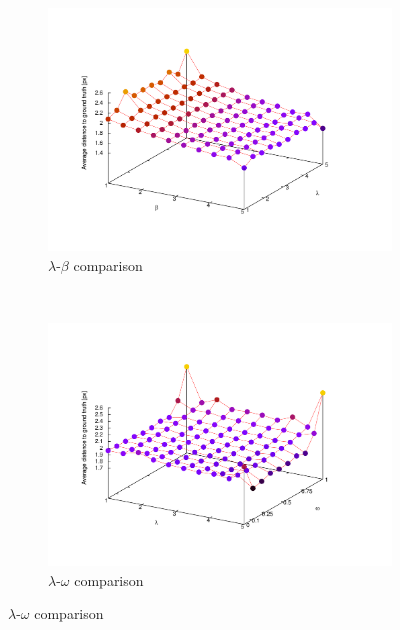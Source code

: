 \begin{figure}[t]
        \centering
        \begin{subfigure}[b]{0.45\textwidth}
                \centering
                \includegraphics[width=\textwidth, trim=80 80 150 100,clip]{fig24.pdf}
                \caption{$\lambda$-$\beta$ comparison}
                \label{fig:cp02_err_measure_lambda_beta}
        \end{subfigure}%
        ~ %
        \begin{subfigure}[b]{0.45\textwidth}
                \centering
                \includegraphics[width=\textwidth, trim=80 80 150 100,clip]{fig25.pdf}
                \caption{$\lambda$-$\omega$ comparison}

\end{subfigure}
\end{figure}
